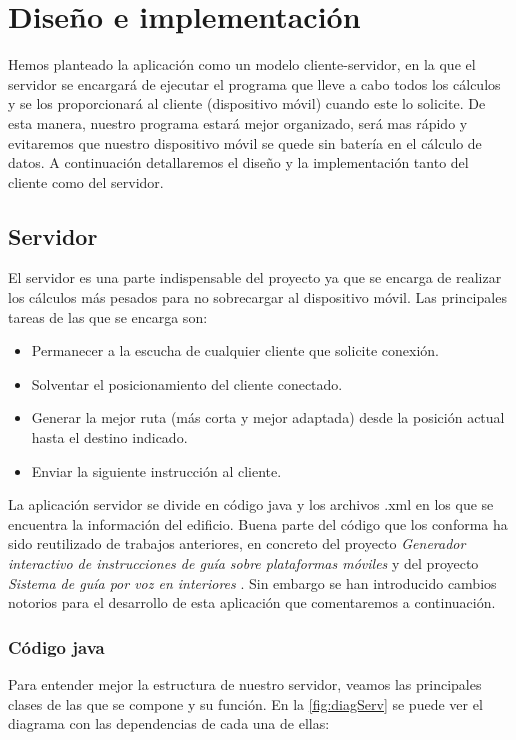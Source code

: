 \chapter{Diseño e implementación}
\label{cap:diseñoeimplementación}


Hemos planteado la aplicación como un modelo cliente-servidor, en la que el servidor se encargará de ejecutar el programa que lleve a cabo todos los cálculos y se los proporcionará al cliente (dispositivo móvil) cuando este lo solicite. De esta manera, nuestro programa estará mejor organizado, será mas rápido y evitaremos que nuestro dispositivo móvil se quede sin batería en el cálculo de datos. A continuación detallaremos el diseño y la implementación tanto del cliente como del servidor.


\section{Servidor}
El servidor es una parte indispensable del proyecto ya que se encarga de realizar los cálculos más pesados para no sobrecargar al dispositivo móvil. Las principales tareas de las que se encarga son:
\begin{itemize}
	\item Permanecer a la escucha de cualquier cliente que solicite conexión.
	\item Solventar el posicionamiento del cliente conectado.
	\item Generar la mejor ruta (más corta y mejor adaptada) desde la posición actual hasta el destino indicado.
	\item Enviar la siguiente instrucción al cliente.	
\end{itemize} 

La aplicación servidor se divide en código java y los archivos .xml en los que se encuentra la información del edificio. Buena parte del código que los conforma ha sido reutilizado de trabajos anteriores, en concreto del proyecto \textit{Generador interactivo de instrucciones de guía sobre plataformas móviles} \citep{TFGguia} y del proyecto \textit{Sistema de guía por voz en interiores} \citep{TFGMariana}. Sin embargo se han introducido cambios notorios para el desarrollo de esta aplicación que comentaremos a continuación.

\subsection{Código java}
Para entender mejor la estructura de nuestro servidor, veamos las principales clases de las que se compone y su función. En la \ref{fig:diagServ} se puede ver el diagrama con las dependencias de cada una de ellas:

